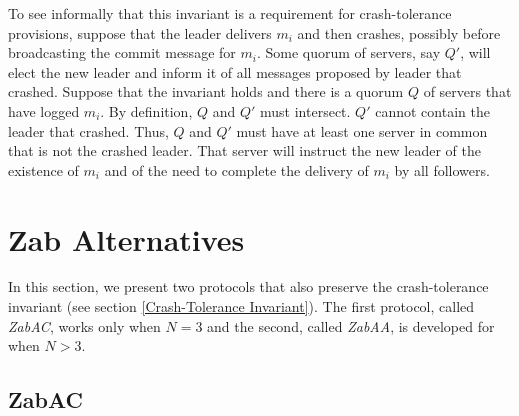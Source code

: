 \documentclass[a4paper,UKenglish]{oasics-v2016}
\begin{document}
To see informally that this invariant is a requirement for crash-tolerance provisions, suppose that the leader delivers $m_i$ and then crashes, possibly before broadcasting the commit message for $m_i$. Some quorum of servers, say $Q'$, will elect the new leader and inform it of all messages proposed by leader that crashed. Suppose that the invariant holds and there is a quorum $Q$ of servers that have logged $m_i$. By definition, $Q$ and $Q'$ must intersect. $Q'$ cannot contain the leader that crashed. Thus, $Q$ and $Q'$ must have at least one server in common that is not the crashed leader. That server will instruct the new leader of the existence of $m_i$ and of the need to complete the delivery of $m_i$ by all followers.




\section{Zab Alternatives} \label{System Model}

In this section, we present two protocols that also preserve the crash-tolerance invariant (see section \ref{Crash-Tolerance Invariant}). The first protocol, called \emph{ZabAC}, works only when $N=3$ and the second, called \emph{ZabAA}, is developed for when $N>3$.

\subsection{ZabAC}
\end{document}
